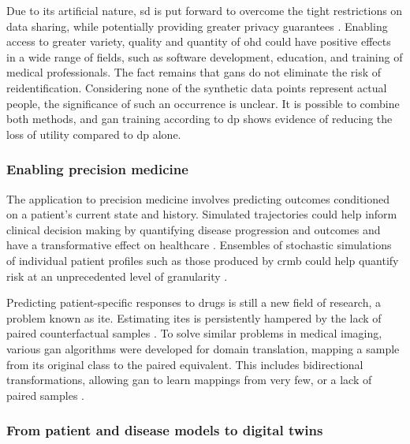             Due to its artificial nature, \gls{sd} is put forward to overcome the tight restrictions on data sharing, while potentially providing greater privacy guarantees \cite{Beaulieu-Jones2019-ct, baowaly_2019_IEEE, baowaly_2019_jamia,esteban2017real,Fisher2019,walsh2020generating, chin2019generation}. Enabling access to greater variety, quality and quantity of \gls{ohd} could have positive effects in a wide range of fields, such as software development, education, and training of medical professionals. The fact remains that \glspl{gan} do not eliminate the risk of reidentification. Considering none of the synthetic data points represent actual people, the significance of such an occurrence is unclear. It is possible to combine both methods, and \gls{gan} training according to \gls{dp} shows evidence of reducing the loss of utility compared to \gls{dp} alone.
    
        \subsubsection{Enabling precision medicine}\label{sec:precision_med}
    
            The application to precision medicine involves predicting outcomes conditioned on a patient's current state and history. Simulated trajectories could help inform clinical decision making by quantifying disease progression and outcomes and have a transformative effect on healthcare \cite{walsh2020generating, Fisher2019}. Ensembles of stochastic simulations of individual patient profiles such as those produced by \gls{crmb} could help quantify risk at an unprecedented level of granularity \cite{Fisher2019}.\par
            Predicting patient-specific responses to drugs is still a new field of research, a problem known as \gls{ite}. Estimating \glspl{ite} is persistently hampered by the lack of paired counterfactual samples \cite{Yoon2018-ite, chu2019treatment}. To solve similar problems in medical imaging, various \gls{gan} algorithms were developed for domain translation, mapping a sample from its original class to the paired equivalent. This includes bidirectional transformations, allowing \gls{gan} to learn mappings from very few, or a lack of paired samples \cite{Wolterink2017DeepMT, CycleGAN2017, mcdermott2018semi}.
    
        \subsubsection{From patient and disease models to digital twins}\label{sec:models_twins}
    
